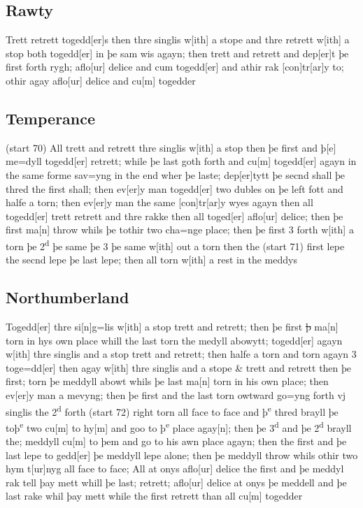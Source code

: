 \documentclass[12pt,letter]{article} %
\newcommand{\srcpg}[1]{(start #1)}
\begin{document}
\subsection{Rawty}
Trett retrett togedd{[}er{]}s then thre singlis w{[}ith{]} a stope and
thre retrett w{[}ith{]} a stop both togedd{[}er{]} in þe sam wis agayn;
then trett and retrett and dep{[}er{]}t þe first forth rygh;
aflo{[}ur{]} delice and cum togedd{[}er{]} and athir rak
{[}con{]}tr{[}ar{]}y to; othir agay aflo{[}ur{]} delice and cu{[}m{]}
togedder

\subsection{Temperance}
\srcpg{70} All trett and retrett thre singlis w{[}ith{]} a stop then þe
first and þ{[}e{]} me=dyll togedd{[}er{]} retrett; while þe last goth
forth and cu{[}m{]} togedd{[}er{]} agayn in the same forme sav=yng in
the end wher þe laste; dep{[}er{]}tytt þe secnd shall þe thred the first
shall; then ev{[}er{]}y man togedd{[}er{]} two dubles on þe left fott
and halfe a torn; then ev{[}er{]}y man the same {[}con{]}tr{[}ar{]}y
wyes agayn then all togedd{[}er{]} trett retrett and thre rakke then all
toged{[}er{]} aflo{[}ur{]} delice; then þe first ma{[}n{]} throw whils
þe tothir two cha=nge place; then þe first 3 forth w{[}ith{]} a torn þe
2\textsuperscript{d} þe same þe 3 þe same w{[}ith{]} out a torn then the
\srcpg{71} first lepe the secnd lepe þe last lepe; then all torn
w{[}ith{]} a rest in the meddys

\subsection{Northumberland}
Togedd{[}er{]} thre si{[}n{]}g=lis w{[}ith{]} a stop trett and retrett;
then þe first \sout{þ} ma{[}n{]} torn in hys own place whill the last
torn the medyll abowytt; togedd{[}er{]} agayn w{[}ith{]} thre singlis
and a stop trett and retrett; then halfe a torn and torn agayn 3
toge=dd{[}er{]} then agay w{[}ith{]} thre singlis and a stope \& trett
and retrett then þe first; torn þe meddyll abowt whils þe last ma{[}n{]}
torn in his own place; then ev{[}er{]}y man a mevyng; then þe first and
the last torn owtward go=yng forth vj singlis the 2\textsuperscript{d}
forth \srcpg{72} right torn all face to face and þ\textsuperscript{e}
thred brayll þe toþ\textsuperscript{e} two cu{[}m{]} to hy{[}m{]} and
goo to þ\textsuperscript{e} place agay{[}n{]}; then þe
3\textsuperscript{d} and þe 2\textsuperscript{d} brayll the; meddyll
cu{[}m{]} to þem and go to his awn place agayn; then the first and þe
last lepe to gedd{[}er{]} þe meddyll lepe alone; then þe meddyll throw
whils othir two hym t{[}ur{]}nyg all face to face; All at onys
aflo{[}ur{]} delice the first and þe meddyl rak tell þay mett whill þe
last; retrett; aflo{[}ur{]} delice at onys þe meddell and þe last rake
whil þay mett while the first retrett than all cu{[}m{]} togedder
\end{document}
